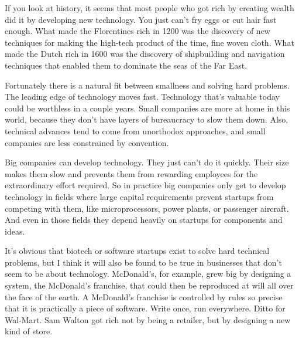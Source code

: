 If you look at history, it seems
                    that most people who got rich by creating wealth did it by
                    developing new technology. You just can't fry eggs or cut
                    hair fast enough. What made the Florentines rich in 1200 was
                    the discovery of new techniques for making the high-tech
                    product of the time, fine woven cloth. What made the Dutch
                    rich in 1600 was the discovery of shipbuilding and
                    navigation techniques that enabled them to dominate the seas
                    of the Far East.

Fortunately there is a natural
                    fit between smallness and solving hard problems. The leading
                    edge of technology moves fast. Technology that's valuable
                    today could be worthless in a couple years. Small companies
                    are more at home in this world, because they don't have
                    layers of bureaucracy to slow them down. Also, technical
                    advances tend to come from unorthodox approaches, and small
                    companies are less constrained by convention.

Big
                    companies can develop technology. They just can't do it
                    quickly. Their size makes them slow and prevents them from
                    rewarding employees for the extraordinary effort required.
                    So in practice big companies only get to develop technology
                    in fields where large capital requirements prevent startups
                    from competing with them, like microprocessors, power
                    plants, or passenger aircraft. And even in those fields they
                    depend heavily on startups for components and ideas.

It's
                    obvious that biotech or software startups exist to solve
                    hard technical problems, but I think it will also be found
                    to be true in businesses that don't seem to be about
                    technology. McDonald's, for example, grew big by designing a
                    system, the McDonald's franchise, that could then be
                    reproduced at will all over the face of the earth. A
                    McDonald's franchise is controlled by rules so precise that
                    it is practically a piece of software. Write once, run
                    everywhere. Ditto for Wal-Mart. Sam Walton got rich not by
                    being a retailer, but by designing a new kind of store.

